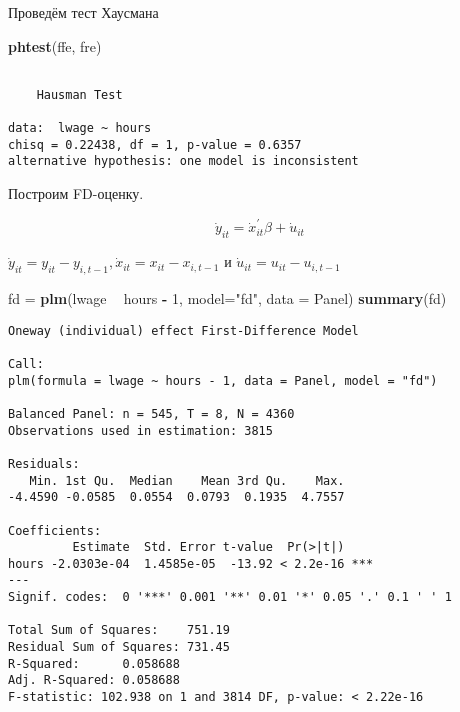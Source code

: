 \documentclass[]{article}
\newenvironment{Shaded}{\begin{snugshade}}{\end{snugshade}}
\newcommand{\DataTypeTok}[1]{\textcolor[rgb]{0.13,0.29,0.53}{#1}}
\newcommand{\DecValTok}[1]{\textcolor[rgb]{0.00,0.00,0.81}{#1}}
\newcommand{\KeywordTok}[1]{\textcolor[rgb]{0.13,0.29,0.53}{\textbf{#1}}}
\newcommand{\NormalTok}[1]{#1}
\newcommand{\OperatorTok}[1]{\textcolor[rgb]{0.81,0.36,0.00}{\textbf{#1}}}
\newcommand{\StringTok}[1]{\textcolor[rgb]{0.31,0.60,0.02}{#1}}
\begin{document}
Проведём тест Хаусмана

\begin{Shaded}
\begin{Highlighting}[]
\KeywordTok{phtest}\NormalTok{(ffe, fre)}
\end{Highlighting}
\end{Shaded}

\begin{verbatim}

    Hausman Test

data:  lwage ~ hours
chisq = 0.22438, df = 1, p-value = 0.6357
alternative hypothesis: one model is inconsistent
\end{verbatim}

Построим FD-оценку.

\begin{equation}
\dot{y}_{i t}=\dot{x}_{i t}^{\prime} \beta+\dot{u}_{i t}
\end{equation}

\(\dot{y}_{i t}=y_{i t}-y_{i, t-1}, \dot{x}_{i t}=x_{i t}-x_{i, t-1}\) и
\(\dot{u}_{i t}=u_{i t}-u_{i, t-1}\)

\begin{Shaded}
\begin{Highlighting}[]
\NormalTok{fd =}\StringTok{ }\KeywordTok{plm}\NormalTok{(lwage }\OperatorTok{~}\StringTok{ }\NormalTok{hours }\OperatorTok{-}\StringTok{ }\DecValTok{1}\NormalTok{, }\DataTypeTok{model=}\StringTok{"fd"}\NormalTok{, }\DataTypeTok{data =}\NormalTok{ Panel)}
\KeywordTok{summary}\NormalTok{(fd)}
\end{Highlighting}
\end{Shaded}

\begin{verbatim}
Oneway (individual) effect First-Difference Model

Call:
plm(formula = lwage ~ hours - 1, data = Panel, model = "fd")

Balanced Panel: n = 545, T = 8, N = 4360
Observations used in estimation: 3815

Residuals:
   Min. 1st Qu.  Median    Mean 3rd Qu.    Max. 
-4.4590 -0.0585  0.0554  0.0793  0.1935  4.7557 

Coefficients:
         Estimate  Std. Error t-value  Pr(>|t|)    
hours -2.0303e-04  1.4585e-05  -13.92 < 2.2e-16 ***
---
Signif. codes:  0 '***' 0.001 '**' 0.01 '*' 0.05 '.' 0.1 ' ' 1

Total Sum of Squares:    751.19
Residual Sum of Squares: 731.45
R-Squared:      0.058688
Adj. R-Squared: 0.058688
F-statistic: 102.938 on 1 and 3814 DF, p-value: < 2.22e-16
\end{verbatim}
\end{document}
